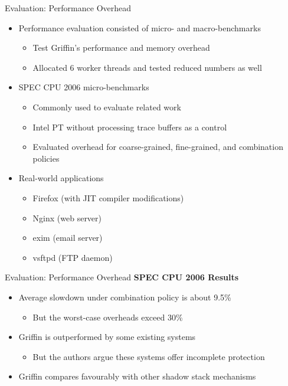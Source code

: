 \documentclass[12pt, dvipsnames, aspectratio=169]{beamer}
\begin{document}
\begin{frame}[c]{Evaluation: Performance Overhead}{}
  \begin{itemize}
    \item Performance evaluation consisted of micro- and macro-benchmarks
    \begin{itemize}
      \item Test Griffin's performance and memory overhead
      \item Allocated 6 worker threads and tested reduced numbers as well
    \end{itemize}

    \vfill
    \item SPEC CPU 2006 micro-benchmarks
    \begin{itemize}
      \item Commonly used to evaluate related work
      \item Intel PT without processing trace buffers as a control
      \item Evaluated overhead for coarse-grained, fine-grained, and combination policies
    \end{itemize}

    \vfill
    \item Real-world applications
    \begin{itemize}
      \item Firefox (with JIT compiler modifications)
      \item Nginx (web server)
      \item exim (email server)
      \item vsftpd (FTP daemon)
    \end{itemize}
  \end{itemize}
\end{frame}

\begin{frame}[c]{Evaluation: Performance Overhead}{}
  {\bf SPEC CPU 2006 Results}
  \begin{itemize}
    \item Average slowdown under combination policy is about 9.5\%
    \begin{itemize}
      \item But the worst-case overheads exceed 30\%
    \end{itemize}
    \item Griffin is outperformed by some existing systems
    \begin{itemize}
      \item But the authors argue these systems offer incomplete protection
    \end{itemize}
    \item Griffin compares favourably with other shadow stack mechanisms
  \end{itemize}
\end{frame}
\end{document}
